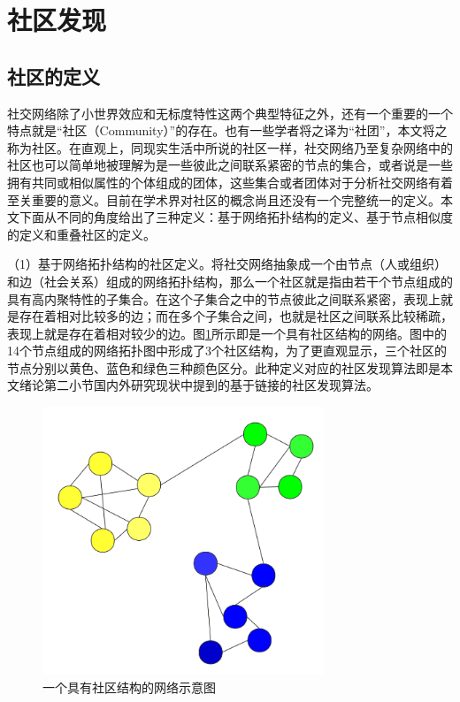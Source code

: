 \section{社区发现}
\subsection{社区的定义}
社交网络除了小世界效应和无标度特性这两个典型特征之外，还有一个重要的一个特点就是“社区（Community）”的存在。也有一些学者将之译为“社团”，本文将之称为社区。在直观上，同现实生活中所说的社区一样，社交网络乃至复杂网络中的社区也可以简单地被理解为是一些彼此之间联系紧密的节点的集合，或者说是一些拥有共同或相似属性的个体组成的团体，这些集合或者团体对于分析社交网络有着至关重要的意义。目前在学术界对社区的概念尚且还没有一个完整统一的定义。本文下面从不同的角度给出了三种定义：基于网络拓扑结构的定义、基于节点相似度的定义和重叠社区的定义。

（1）基于网络拓扑结构的社区定义。将社交网络抽象成一个由节点（人或组织）和边（社会关系）组成的网络拓扑结构，那么一个社区就是指由若干个节点组成的具有高内聚特性的子集合。在这个子集合之中的节点彼此之间联系紧密，表现上就是存在着相对比较多的边；而在多个子集合之间，也就是社区之间联系比较稀疏，表现上就是存在着相对较少的边。图\ref{fig:fig2-3}所示即是一个具有社区结构的网络。图中的14个节点组成的网络拓扑图中形成了3个社区结构，为了更直观显示，三个社区的节点分别以黄色、蓝色和绿色三种颜色区分。此种定义对应的社区发现算法即是本文绪论第二小节国内外研究现状中提到的基于链接的社区发现算法。

\begin{figure}
  \centering
  \includegraphics[width=0.75\textwidth]{figures/fig2-3}
  \caption{一个具有社区结构的网络示意图}\label{fig:fig2-3}
\end{figure}

